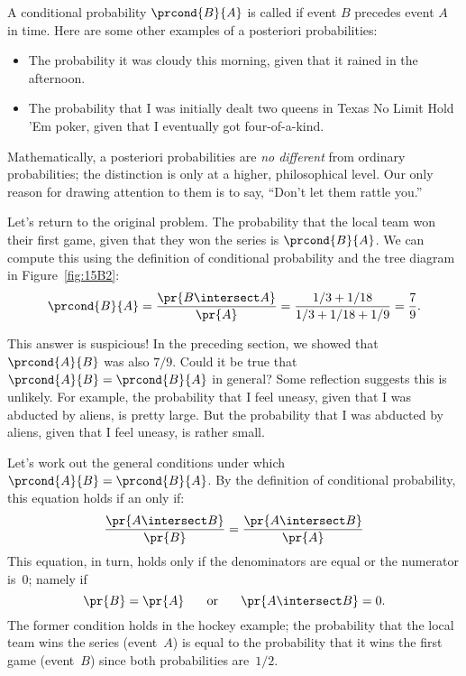 A conditional probability $\prcond{B}{A}$ is called   if event $B$ precedes event $A$ in time.  Here are some
other examples of a posteriori probabilities:
%
\begin{itemize}
\item The probability it was cloudy this morning, given that it rained
in the afternoon.
\item The probability that I was initially dealt two queens in Texas
No Limit Hold 'Em poker, given that I eventually got four-of-a-kind.
\end{itemize}
%
Mathematically, a posteriori probabilities are \emph{no different}
from ordinary probabilities; the distinction is only at a higher,
philosophical level.  Our only reason for drawing attention to them is
to say, ``Don't let them rattle you.''

Let's return to the original problem.  The probability that the
local team won their first game, given that they won the series
is $\prcond{B}{A}$.  We can compute this using the definition of
conditional probability and the tree diagram in Figure~\ref{fig:15B2}:
%
\begin{align*}
\prcond{B}{A}  = \frac{\pr{B \intersect A}}{\pr{A}} %
               = \frac{1/3 + 1/18}{1/3 + 1/18 + 1/9} %
               = \frac{7}{9}.
\end{align*}

This answer is suspicious!  In the preceding section, we showed that
$\prcond{A}{B}$ was also $7/9$.  Could it be true that $\prcond{A}{B}
= \prcond{B}{A}$ in general?  Some reflection suggests this is
unlikely.  For example, the probability that I feel uneasy, given that
I was abducted by aliens, is pretty large.  But the probability that I
was abducted by aliens, given that I feel uneasy, is rather small.

Let's work out the general conditions under which $\prcond{A}{B} =
\prcond{B}{A}$.  By the definition of conditional probability, this
equation holds if an only if:
%
\[
\frac{\pr{A \intersect B}}{\pr{B}} = \frac{\pr{A \intersect B}}{\pr{A}}
\]
%
This equation, in turn, holds only if the denominators are equal or
the numerator is~0; namely if
%
\[
\pr{B} = \pr{A}
\hspace{0.25in} \text{or} \hspace{0.25in}
\pr{A \intersect B} = 0.
\]
%
The former condition holds in the hockey example; the probability that
the local team wins the series (event~$A$) is equal to the
probability that it wins the first game (event~$B$) since both
probabilities are~$1/2$.

